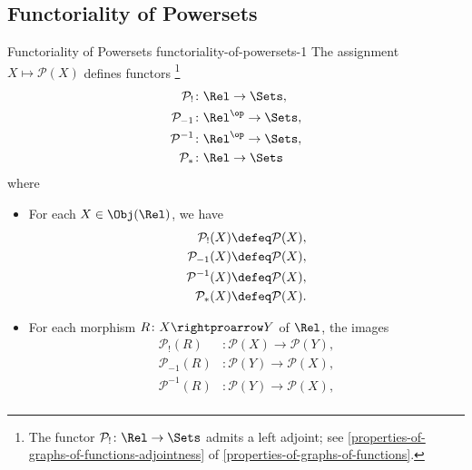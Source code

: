 \subsection{Functoriality of Powersets}\label{subsection-functoriality-of-powersets}
\begin{proposition}{Functoriality of Powersets \rmI}{functoriality-of-powersets-1}%
    The assignment $X\mapsto\mathcal{P}(X)$ defines functors%
    \footnote{%
        The functor $\mathcal{P}_{!}\colon\Rel\to\Sets$ admits a left adjoint; see \cref{properties-of-graphs-of-functions-adjointness} of \cref{properties-of-graphs-of-functions}.
        \par\vspace*{\TCBBoxCorrection}
    }%
    \begin{align*}
        \mathcal{P}_{!}  &\colon \Rel       \to \Sets,\\%
        \mathcal{P}_{-1} &\colon \Rel^{\op} \to \Sets,\\%
        \mathcal{P}^{-1} &\colon \Rel^{\op} \to \Sets,\\%
        \mathcal{P}_{*}  &\colon \Rel       \to \Sets%
    \end{align*}
    where
    \begin{itemize}
        \item{}For each $X\in\Obj(\Rel)$, we have
            \begin{align*}
                \mathcal{P}_{!}(X)  &\defeq \mathcal{P}(X),\\%
                \mathcal{P}_{-1}(X) &\defeq \mathcal{P}(X),\\%
                \mathcal{P}^{-1}(X) &\defeq \mathcal{P}(X),\\%
                \mathcal{P}_{*}(X)  &\defeq \mathcal{P}(X).%
            \end{align*}
        \item{}For each morphism $R\colon X\rightproarrow Y$ of $\Rel$, the images
            \begin{align*}
                \mathcal{P}_{!}(R)  &\colon \mathcal{P}(X) \to \mathcal{P}(Y),\\%
                \mathcal{P}_{-1}(R) &\colon \mathcal{P}(Y) \to \mathcal{P}(X),\\%
                \mathcal{P}^{-1}(R) &\colon \mathcal{P}(Y) \to \mathcal{P}(X),\\%

\end{align*}
\end{itemize}
\end{proposition}
